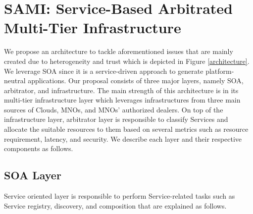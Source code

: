 \documentclass[conference]{IEEEtran}
\begin{document}
\section{SAMI: Service-Based Arbitrated Multi-Tier Infrastructure}
We propose an architecture to tackle aforementioned issues that are mainly created due to heterogeneity and trust which is depicted in Figure  \ref{architecture}. We leverage SOA since it is a service-driven approach to generate platform-neutral applications. Our proposal consists of three major layers, namely SOA, arbitrator, and infrastructure. The main strength of this architecture is in its multi-tier infrastructure layer which leverages infrastructures from three main sources of Clouds, MNOs, and MNOs' authorized dealers. On top of the infrastructure layer, arbitrator layer is responsible to classify Services and allocate the suitable resources to them based on several metrics such as resource requirement, latency, and security. We describe each layer and their respective components as follows.

\subsection{SOA Layer} 
Service oriented layer is responsible to perform Service-related tasks such as Service registry, discovery, and composition that are explained as follows.
\end{document}
